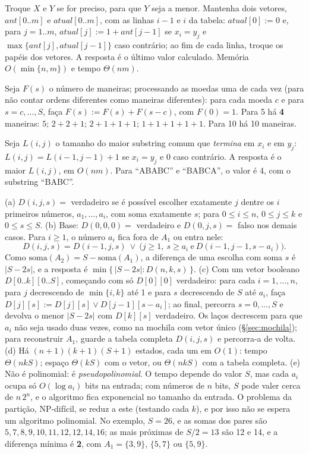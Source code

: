  Troque $X$ e $Y$ se for preciso, para que $Y$ seja a menor. Mantenha dois vetores, $ant[0..m]$ e $atual[0..m]$, com as linhas $i-1$ e $i$ da tabela: $atual[0]:=0$ e, para $j=1..m$, $atual[j]:=1+ant[j-1]$ se $x_i=y_j$ e $\max\{ant[j],atual[j-1]\}$ caso contrário; ao fim de cada linha, troque os papéis dos vetores. A resposta é o último valor calculado. Memória $O(\min\{n,m\})$ e tempo $\Theta(nm)$.

 Seja $F(s)$ o número de maneiras; processando as moedas uma de cada vez (para não contar ordens diferentes como maneiras diferentes): para cada moeda $c$ e para $s=c,\dots,S$, faça $F(s):=F(s)+F(s-c)$, com $F(0)=1$. Para 5 há \textbf{4} maneiras: $5$; $2+2+1$; $2+1+1+1$; $1+1+1+1+1$. Para 10 há 10 maneiras.

 Seja $L(i,j)$ o tamanho do maior substring comum que \emph{termina} em $x_i$ e em $y_j$: $L(i,j)=L(i-1,j-1)+1$ se $x_i=y_j$ e $0$ caso contrário. A resposta é o maior $L(i,j)$, em $O(nm)$. Para ``ABABC'' e ``BABCA'', o valor é 4, com o substring ``BABC''.

 (a) $D(i,j,s)=$ verdadeiro se é possível escolher exatamente $j$ dentre os $i$ primeiros números, $a_1,\dots,a_i$, com soma exatamente $s$; para $0\le i\le n$, $0\le j\le k$ e $0\le s\le S$. (b) Base: $D(0,0,0)=$ verdadeiro e $D(0,j,s)=$ falso nos demais casos. Para $i\ge1$, o número $a_i$ fica fora de $A_1$ ou entra nele:
\[D(i,j,s)=D(i-1,j,s)\ \lor\ \bigl(j\ge1,\ s\ge a_i\ \text{e}\ D(i-1,j-1,s-a_i)\bigr).\]
Como $\mathrm{soma}(A_2)=S-\mathrm{soma}(A_1)$, a diferença de uma escolha com soma $s$ é $|S-2s|$, e a resposta é $\min\{\,|S-2s| : D(n,k,s)\,\}$. (c) Com um vetor booleano $D[0..k][0..S]$, começando com só $D[0][0]$ verdadeiro: para cada $i=1,\dots,n$, para $j$ decrescendo de $\min\{i,k\}$ até 1 e para $s$ decrescendo de $S$ até $a_i$, faça $D[j][s]:=D[j][s]\lor D[j-1][s-a_i]$; ao final, percorra $s=0,\dots,S$ e devolva o menor $|S-2s|$ com $D[k][s]$ verdadeiro. Os laços decrescem para que $a_i$ não seja usado duas vezes, como na mochila com vetor único (§\ref{sec:mochila}); para reconstruir $A_1$, guarde a tabela completa $D(i,j,s)$ e percorra-a de volta. (d) Há $(n+1)(k+1)(S+1)$ estados, cada um em $O(1)$: tempo $\Theta(nkS)$; espaço $\Theta(kS)$ com o vetor, ou $\Theta(nkS)$ com a tabela completa. (e) Não é polinomial: é \emph{pseudopolinomial}. O tempo depende do valor $S$, mas cada $a_i$ ocupa só $O(\log a_i)$ bits na entrada; com números de $n$ bits, $S$ pode valer cerca de $n\,2^n$, e o algoritmo fica exponencial no tamanho da entrada. O problema da partição, NP-difícil, se reduz a este (testando cada $k$), e por isso não se espera um algoritmo polinomial. No exemplo, $S=26$, e as somas dos pares são $5,7,8,9,10,11,12,12,14,16$; as mais próximas de $S/2=13$ são 12 e 14, e a diferença mínima é \textbf{2}, com $A_1=\{3,9\}$, $\{5,7\}$ ou $\{5,9\}$.
